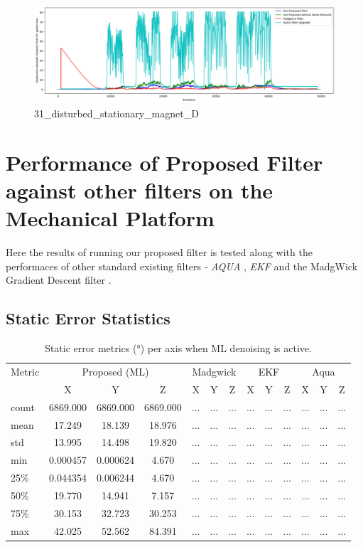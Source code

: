 \documentclass{iutbscthesis}
\begin{document}
\begin{figure}[H]
    \centering
    \includegraphics[width=0.9\linewidth]{figures/31_disturbed_stationary_magnet_D.png}
    \caption{31\_disturbed\_stationary\_magnet\_D}
    \label{fig:31_disturbed_stationary_magnet_D}
\end{figure}

\section{Performance of Proposed Filter against other filters on the Mechanical Platform} \label{section:mechanical_platform_result}
Here the results of running our proposed filter is tested along with the performaces of 
other standard existing filters - \emph{AQUA} \cite{aqua_ref}, \emph{EKF} \cite{ekf_ref} and the 
MadgWick Gradient Descent filter \cite{madgwick2011estimation}. 


\subsection{Static Error Statistics}


\begin{table}[H]
\centering
\caption{Static error metrics (°) per axis when ML denoising is active.}
\label{tab:static_ml}
\begin{tabular}{l
  *{4}{ccc}
}
\toprule
Metric & \multicolumn{3}{c}{Proposed (ML)} & \multicolumn{3}{c}{Madgwick} & \multicolumn{3}{c}{EKF} & \multicolumn{3}{c}{Aqua} \\
 & X & Y & Z & X & Y & Z & X & Y & Z & X & Y & Z \\
\midrule
count & 6869.000 & 6869.000 & 6869.000 & ... & ... & ... & ... & ... & ... & ... & ... & ... \\
mean & 17.249 & 18.139 & 18.976 & ... & ... & ... & ... & ... & ... & ... & ... & ... \\
std & 13.995 & 14.498 & 19.820 & ... & ... & ... & ... & ... & ... & ... & ... & ... \\
min & 0.000457 & 0.000624 & 4.670 & ... & ... & ... & ... & ... & ... & ... & ... & ... \\
25\% & 0.044354 & 0.006244 & 4.670 & ... & ... & ... & ... & ... & ... & ... & ... & ... \\
50\% & 19.770 & 14.941 & 7.157 & ... & ... & ... & ... & ... & ... & ... & ... & ... \\
75\% & 30.153 & 32.723 & 30.253 & ... & ... & ... & ... & ... & ... & ... & ... & ... \\
max & 42.025 & 52.562 & 84.391 & ... & ... & ... & ... & ... & ... & ... & ... & ... \\
\bottomrule
\end{tabular}
\end{table}
\end{document}
